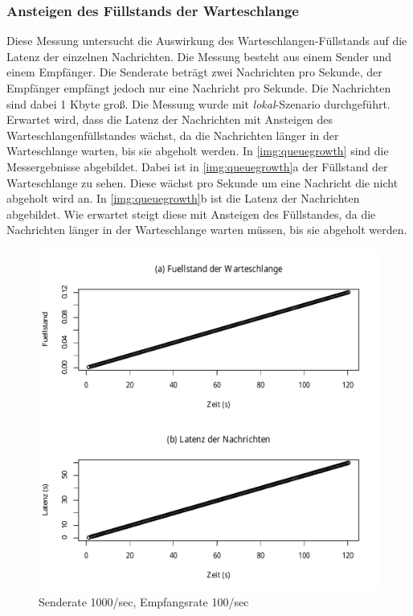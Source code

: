 \subsubsection{Ansteigen des Füllstands der Warteschlange}
\label{sec:queueGrowth}
Diese Messung untersucht die Auswirkung des Warteschlangen-Füllstands auf die Latenz der einzelnen Nachrichten. Die Messung besteht aus einem Sender und einem Empfänger. Die Senderate beträgt zwei Nachrichten pro Sekunde, der Empfänger empfängt jedoch nur eine Nachricht pro Sekunde. Die Nachrichten sind dabei 1 Kbyte groß. Die Messung wurde mit \textit{lokal}-Szenario durchgeführt. Erwartet wird, dass die Latenz der Nachrichten mit Ansteigen des Warteschlangenfüllstandes wächst, da die Nachrichten länger in der Warteschlange warten, bis sie abgeholt werden.
In \autoref{img:queuegrowth} sind die Messergebnisse abgebildet. Dabei ist in \autoref{img:queuegrowth}a der Füllstand der Warteschlange zu sehen. Diese wächst pro Sekunde um eine Nachricht die nicht abgeholt wird an. In \autoref{img:queuegrowth}b ist die Latenz der Nachrichten abgebildet. Wie erwartet steigt diese mit Ansteigen des Füllstandes, da die Nachrichten länger in der Warteschlange warten müssen, bis sie abgeholt werden.
\begin{figure}
\center
  \includegraphics[width=1\textwidth]{images/measurement/queuegrowth.pdf}
  \caption{Senderate 1000/sec, Empfangsrate 100/sec}
  \label{img:queuegrowth}
\end{figure}

